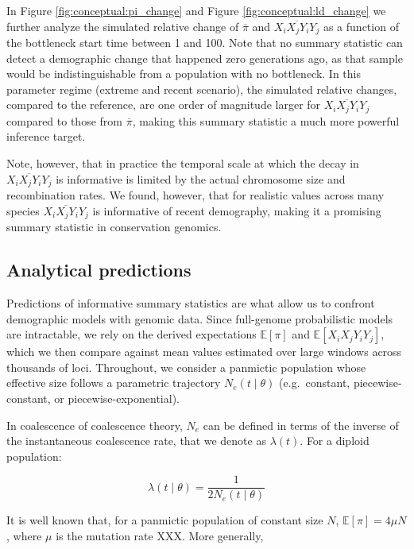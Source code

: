 \documentclass[12pt]{article}
\begin{document}
In Figure \ref{fig:conceptual:pi_change} and Figure \ref{fig:conceptual:ld_change} we further analyze the simulated relative change of $\overline{\pi}$ and $\overline{X_iX_jY_iY_j}$ as a function of the bottleneck start time between 1 and 100. Note that no summary statistic can detect a demographic change that happened zero generations ago, as that sample would be indistinguishable from a population with no bottleneck. In this parameter regime (extreme and recent scenario), the simulated relative changes, compared to the reference, are one order of magnitude larger for $\overline{X_iX_jY_iY_j}$ compared to those from $\overline{\pi}$, making this summary statistic a much more powerful inference target.

Note, however, that in practice the temporal scale at which the decay in $\overline{X_iX_jY_iY_j}$ is informative is limited by the actual chromosome size and recombination rates. We found, however, that for realistic values across many species $\overline{X_iX_jY_iY_j}$ is informative of recent demography, making it a promising summary statistic in conservation genomics.

\subsection{Analytical predictions}

Predictions of informative summary statistics are what allow us to confront demographic models with genomic data. Since full-genome probabilistic models are intractable, we rely on the derived expectations $\mathbb E[\pi]$ and $\mathbb E[X_iX_jY_iY_j]$, which we then compare against mean values estimated over large windows across thousands of loci. Throughout, we consider a panmictic population whose effective size follows a parametric trajectory $N_e(t \mid \theta)$ (e.g.\ constant, piecewise-constant, or piecewise-exponential).

In coalescence of coalescence theory, $N_e$ can be defined in terms of the inverse of the instantaneous coalescence rate, that we denote as $\lambda(t)$. For a diploid population:

\begin{equation}
	\lambda(t \mid \theta) = \frac{1}{2N_e(t \mid \theta)}
\end{equation}

It is well known that, for a panmictic population of constant size $N$, $\mathbb{E}[\pi] = 4\mu N$, where $\mu$ is the mutation rate XXX. More generally,
\end{document}
